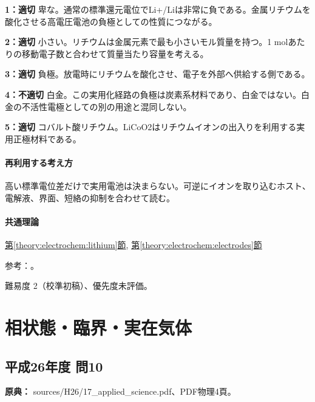 \noindent\textbf{1：適切} 卑な。通常の標準還元電位でLi+/Liは非常に負である。金属リチウムを酸化させる高電圧電池の負極としての性質につながる。\par

\noindent\textbf{2：適切} 小さい。リチウムは金属元素で最も小さいモル質量を持つ。1 molあたりの移動電子数と合わせて質量当たり容量を考える。\par

\noindent\textbf{3：適切} 負極。放電時にリチウムを酸化させ、電子を外部へ供給する側である。\par

\noindent\textbf{4：不適切} 白金。この実用化経路の負極は炭素系材料であり、白金ではない。白金の不活性電極としての別の用途と混同しない。\par

\noindent\textbf{5：適切} コバルト酸リチウム。LiCoO2はリチウムイオンの出入りを利用する実用正極材料である。\par

\paragraph{再利用する考え方} 高い標準電位差だけで実用電池は決まらない。可逆にイオンを取り込むホスト、電解液、界面、短絡の抑制を合わせて読む。

\paragraph{共通理論} \hyperref[theory:electrochem:lithium]{第\ref*{theory:electrochem:lithium}節}, \hyperref[theory:electrochem:electrodes]{第\ref*{theory:electrochem:electrodes}節}

\par 参考：\cite{nobel_lithium2019,openstax_batteries}。

\par 難易度 2（校準初稿）、優先度未評価。

\section{相状態・臨界・実在気体}

\subsection{平成26年度 問10}
\label{q:h26-reg-applied-10}

\noindent\textbf{原典：} sources/H26/17\_applied\_science.pdf、PDF物理4頁。

